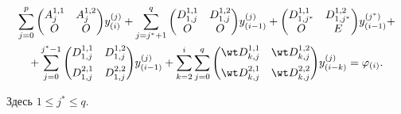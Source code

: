 \begin{pf}
\begin{multline}
\sum_{j=0}^{p}{


{\begin{pmatrix}


 A_j^{1,1} & A_j^{1,2} \\  O & O


\end{pmatrix}}


y_{(i)}^{(j)}}+


 \sum_{j=j^*+1}^{q}{


{\begin{pmatrix}


 D_{1,j}^{1,1} & D_{1,j}^{1,2} \\  O & O


\end{pmatrix}}


y_{(i-1)}^{(j)}}+


{\begin{pmatrix}


 D_{1,j^*}^{1,1} & D_{1,j^*}^{1,2} \\  O & E


\end{pmatrix}}


y_{(i-1)}^{(j^*)}+ \\


%


+ \sum_{j=0}^{j^*-1}{


\begin{pmatrix}


 D_{1,j}^{1,1} & D_{1,j}^{1,2} \\[2mm]


 D_{1,j}^{2,1} & D_{1,j}^{2,2}


\end{pmatrix}}


y_{(i-1)}^{(j)}+\sum_{k=2}^{i}{\sum_{j=0}^{q}{


{\begin{pmatrix}


 \wt D_{k,j}^{1,1} & \wt D_{k,j}^{1,2}\\[2mm]


 \wt D_{k,j}^{2,1} & \wt D_{k,j}^{2,2}


\end{pmatrix}}


y_{(i-k)}^{(j)}}}=\varphi_{(i)}.


\end{multline}


Здесь $1 \le j^* \le q$.






\end{pf}
